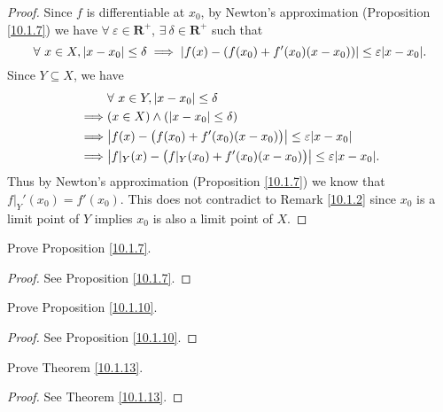 \begin{proof}
    Since \(f\) is differentiable at \(x_0\), by Newton's approximation (Proposition \ref{10.1.7}) we have \(\forall\ \varepsilon \in \mathbf{R}^+\), \(\exists\ \delta \in \mathbf{R}^+\) such that
    \[
        \forall\ x \in X, \abs*{x - x_0} \leq \delta \implies \abs*{f(x) - (f(x_0) + f'(x_0)(x - x_0))} \leq \varepsilon \abs*{x - x_0}.
    \]
    Since \(Y \subseteq X\), we have
    \begin{align*}
                 & \forall\ x \in Y, \abs*{x - x_0} \leq \delta                                             \\
        \implies & (x \in X) \land (\abs*{x - x_0} \leq \delta)                                             \\
        \implies & \abs*{f(x) - \big(f(x_0) + f'(x_0)(x - x_0)\big)} \leq \varepsilon \abs*{x - x_0}        \\
        \implies & \abs*{f|_Y(x) - \big(f|_Y(x_0) + f'(x_0)(x - x_0)\big)} \leq \varepsilon \abs*{x - x_0}.
    \end{align*}
    Thus by Newton's approximation (Proposition \ref{10.1.7}) we know that \(f|_Y'(x_0) = f'(x_0)\).
    This does not contradict to Remark \ref{10.1.2} since \(x_0\) is a limit point of \(Y\) implies \(x_0\) is also a limit point of \(X\).
\end{proof}

\begin{exercise}\label{ex 10.1.2}
    Prove Proposition \ref{10.1.7}.
\end{exercise}

\begin{proof}
    See Proposition \ref{10.1.7}.
\end{proof}

\begin{exercise}\label{ex 10.1.3}
    Prove Proposition \ref{10.1.10}.
\end{exercise}

\begin{proof}
    See Proposition \ref{10.1.10}.
\end{proof}

\begin{exercise}\label{ex 10.1.4}
    Prove Theorem \ref{10.1.13}.
\end{exercise}

\begin{proof}
    See Theorem \ref{10.1.13}.
\end{proof}

